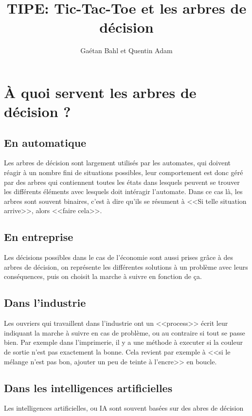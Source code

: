 \documentclass{article}
\title{TIPE: Tic-Tac-Toe et les arbres de décision}
\author{Gaétan Bahl et Quentin Adam}
\begin{document}
\maketitle
\tableofcontents

\section{\uppercase{à} quoi servent les arbres de décision ?}

\subsection{En automatique}

Les arbres de décision sont largement utilisés par les automates,
 qui doivent réagir à un nombre fini de situations possibles, 
leur comportement est donc géré par des arbres qui contiennent
 toutes les états dans lesquels peuvent se trouver les différents 
éléments avec lesquels doit intéragir l'automate.
Dans ce cas là, les arbres sont souvent binaires, 
c'est à dire qu'ils se résument à <<Si telle situation arrive>>, alors <<faire cela>>.

\subsection{En entreprise}

Les décisions possibles dans le cas de l'économie sont aussi prises grâce à des arbres de décision,
on représente les différentes solutions à un problème avec leurs conséquences, puis on choisit 
la marche à suivre en fonction de ça.

\subsection{Dans l'industrie}

Les ouvriers qui travaillent dans l'industrie ont un <<process>> écrit 
leur indiquant la marche à suivre en cas de problème, 
ou au contraire si tout se passe bien. Par exemple dans l'imprimerie, il y a une méthode à executer si la 
couleur de sortie n'est pas exactement la bonne.
Cela revient par exemple à <<si le mélange n'est pas bon, ajouter un peu de teinte à l'encre>> en boucle.

\subsection{Dans les intelligences artificielles}

Les intelligences artificielles, ou IA sont souvent basées sur des abres de décision 
\end{document}
